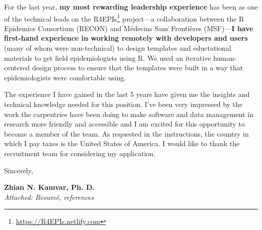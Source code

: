 
\vspace{1ex}

For the last year, \textbf{my most rewarding leadership experience} has been as one of
the technical leads on the R4EPIs\footnote{\url{https://R4EPIs.netlify.com}}
project---a collaboration between the R Epidemics Consortium (RECON) and
M\'{e}decins Sans Fronti\`{e}res (MSF)---\textbf{I have first-hand experience
in working remotely with developers and users} (many of whom were
non-technical) to design templates and eductational materials to get field
epidemiologists using R. We used an iterative human-centered design process to
ensure that the templates were built in a way that epidemiologists were 
comfortable using. 

\vspace{1ex}

The experience I have gained in the last 5 years have given me the insights and
technical knowledge needed for this position. I've been very impressed by the
work the carpentries have been doing to make software and data management in
research more friendly and accessible and I am excited for this opportunity to
become a member of the team. As requested in the instructions, the country in
which I pay taxes is the United States of America. I would like to thank the
recruitment team for considering my application. 

\vspace{2ex}

Sincerely,

\vspace{5ex}

\textbf{Zhian N. Kamvar, Ph. D.}\\
\textit{Attached: Resum\'{e}, references}



\clearpage
